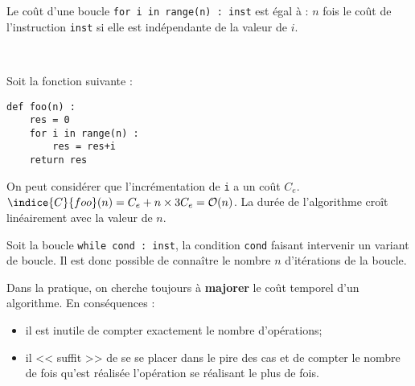 \begin{resultat}
Le coût d'une boucle \texttt{for i in range(n) : inst}  est égal à : $n$ fois le coût de l'instruction \texttt{inst} si elle est indépendante de la valeur de $i$.
\end{resultat}

\begin{exemple}~\\ \vspace{-.3cm}
\noindent\begin{minipage}[c]{.47\linewidth}
Soit la fonction suivante : 
\begin{lstlisting}
def foo(n) :
    res = 0
    for i in range(n) :
        res = res+i
    return res
\end{lstlisting}

\end{minipage}\hfill
\begin{minipage}[c]{.47\linewidth}
On peut considérer que l'incrémentation de \texttt{i} a un coût $C_e$. 
$\indice{C}{foo}(n) = C_e + n\times 3C_e = \mathcal{O}(n)$.
La durée de l'algorithme croît linéairement avec la valeur de $n$.
\end{minipage}
\end{exemple}


\begin{resultat}
Soit la boucle \texttt{while cond : inst}, la condition \texttt{cond} faisant intervenir un variant de boucle. Il est donc possible de connaître le nombre $n$ d'itérations de la boucle. 
\end{resultat}




\begin{resultat}
Dans la pratique, on cherche toujours à \textbf{majorer} le coût temporel d'un algorithme. En conséquences :
\begin{itemize}
\item il est inutile de compter exactement le nombre d'opérations;
\item il << suffit >> de se se placer dans le pire des cas et de compter le nombre de fois qu'est réalisée l'opération se réalisant le plus de fois. 
\end{itemize}
\end{resultat}

